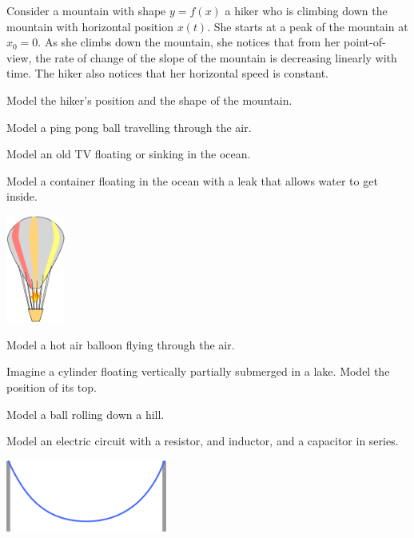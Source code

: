
\begin{exercises}

	\begin{problist}
	
	\prob Consider a mountain with shape $y=f(x)$ a hiker who is climbing down the mountain with horizontal position $x(t)$. She starts at a peak of the mountain at $x_0=0$. As she climbs down the mountain, she notices that from her point-of-view, the rate of change of the slope of the mountain is decreasing linearly with time.
		The hiker also notices that her horizontal speed is constant.
	
		Model the hiker's position and the shape of the mountain.
	

	\prob Model a ping pong ball travelling through the air.
	
	\prob Model an old TV floating or sinking in the ocean.
	
	\prob Model a container floating in the ocean with a leak that allows water to get inside.
	
	\begin{center}
		\includegraphics*[height=100pt]{images/module20-hotairballoon.pdf}
	\end{center}
	
	\prob Model a hot air balloon flying through the air.
	
	\prob Imagine a cylinder floating vertically partially submerged in a lake. Model the position of its top.
	
	\prob Model a ball rolling down a hill.
	
	\prob Model an electric circuit with a resistor, and inductor, and a capacitor in series.
	
	\begin{center}
		\includegraphics*[width=150pt]{images/module20-catenary.pdf}
	\end{center}


\end{problist}
\end{exercises}
